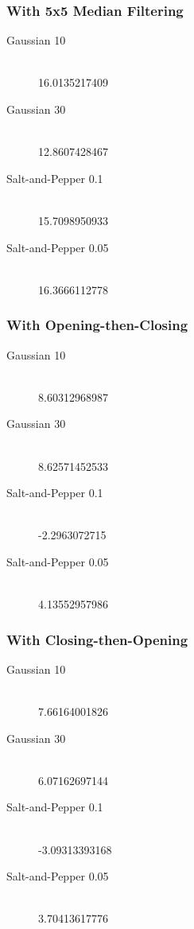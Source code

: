 \documentclass{article}
\begin{document}
\subsubsection{With 5x5 Median Filtering}
\begin{description}
  \item[Gaussian 10] \hfill \\
  16.0135217409
  \item[Gaussian 30] \hfill \\
  12.8607428467
  \item[Salt-and-Pepper 0.1] \hfill \\
  15.7098950933
  \item[Salt-and-Pepper 0.05] \hfill \\
  16.3666112778
\end{description}

\subsubsection{With Opening-then-Closing}
\begin{description}
  \item[Gaussian 10] \hfill \\
  8.60312968987
  \item[Gaussian 30] \hfill \\
  8.62571452533
  \item[Salt-and-Pepper 0.1] \hfill \\
  -2.2963072715
  \item[Salt-and-Pepper 0.05] \hfill \\
  4.13552957986
\end{description}

\subsubsection{With Closing-then-Opening}
\begin{description}
  \item[Gaussian 10] \hfill \\
  7.66164001826
  \item[Gaussian 30] \hfill \\
  6.07162697144
  \item[Salt-and-Pepper 0.1] \hfill \\
  -3.09313393168
  \item[Salt-and-Pepper 0.05] \hfill \\
  3.70413617776
\end{description}
\end{document}
